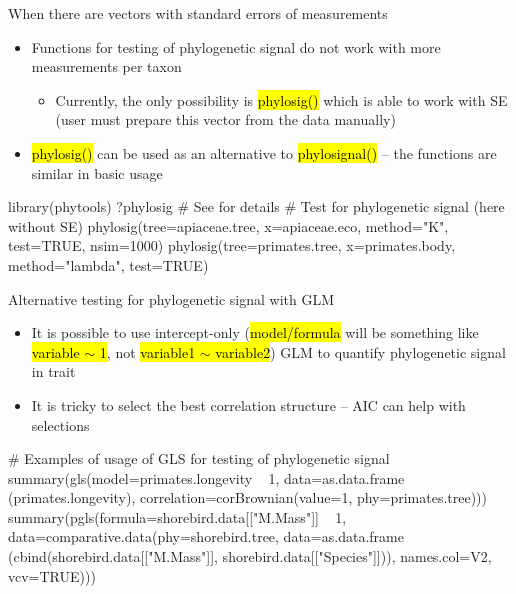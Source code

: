 \documentclass[compress, ucs, xelatex, 11pt, xcolor=svgnames,
  hyperref={
    bookmarks=true,
    unicode=true,
    colorlinks=true,
    pdftitle={Molecular data in R},
    plainpages=false,
    pdfauthor={Vojtech Zeisek},
    pdfsubject={Course about phylogeny and evolution in R},
    pdfcreator={XeLaTeX},
    pdfkeywords={R, evolution, phylogeny, molecular data},
    linkcolor=Tomato,
    anchorcolor=SaddleBrown,
    citecolor=Goldenrod,
    filecolor=DarkMagenta,
    menucolor=Sienna,
    urlcolor=DarkTurquoise,
    pdftex},
  url={hyphens, lowtilde} %
  ]{beamer}
\renewcommand{\texttt}[1]{\hl{\ttfamily #1}}
\begin{document}
\begin{frame}[fragile]{When there are vectors with standard errors of measurements}
  \begin{itemize}
    \item Functions for testing of phylogenetic signal do not work with more measurements per taxon
    \begin{itemize}
      \item Currently, the only possibility is \texttt{phylosig()} which is able to work with SE (user must prepare this vector from the data manually)
    \end{itemize}
    \item \texttt{phylosig()} can be used as an alternative to \texttt{phylosignal()} -- the functions are similar in basic usage
  \end{itemize}
  \begin{spluscode}
    library(phytools)
    ?phylosig # See for details
    # Test for phylogenetic signal (here without SE)
    phylosig(tree=apiaceae.tree, x=apiaceae.eco, method="K", test=TRUE,
      nsim=1000)
    phylosig(tree=primates.tree, x=primates.body, method="lambda",
      test=TRUE)
  \end{spluscode}
\end{frame}

\begin{frame}[fragile]{Alternative testing for phylogenetic signal with GLM}
  \begin{itemize}
    \item It is possible to use intercept-only (\texttt{model/formula} will be something like \texttt{variable $\sim$ 1}, not \texttt{variable1 $\sim$ variable2}) GLM to quantify phylogenetic signal in trait
    \item It is tricky to select the best correlation structure -- AIC can help with selections
  \end{itemize}
  \begin{spluscode}
    # Examples of usage of GLS for testing of phylogenetic signal
    summary(gls(model=primates.longevity ~ 1, data=as.data.frame
      (primates.longevity), correlation=corBrownian(value=1,
      phy=primates.tree)))
    summary(pgls(formula=shorebird.data[["M.Mass"]] ~ 1,
      data=comparative.data(phy=shorebird.tree, data=as.data.frame
      (cbind(shorebird.data[["M.Mass"]], shorebird.data[["Species"]])),
      names.col=V2, vcv=TRUE)))
  \end{spluscode}
\end{frame}
\end{document}
